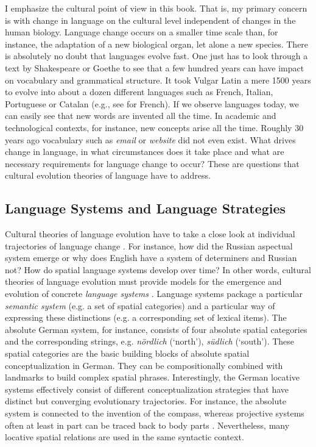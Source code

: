 I emphasize the cultural point of view in this book. That is, my primary concern is
with change in language on the cultural level independent of changes in the human 
biology. Language change occurs on a smaller time scale than, for instance, the 
adaptation of a new biological organ, let alone a new species. There is absolutely no 
doubt that languages evolve fast. One just has to look through a text by 
Shakespeare or Goethe to see that a few hundred years can have impact
on vocabulary and grammatical structure. It took Vulgar Latin a mere 1500 years to 
evolve into about a dozen different languages such as French, Italian, 
Portuguese or Catalan (e.g., see \citealp{pope1952latin} for French). 
If we observe languages today, we can easily see 
that new words are invented all the time.
In academic and technological contexts, for instance, new concepts arise all the time.
Roughly 30 years ago vocabulary such as \textit{email} or \textit{website} did not even exist.
What drives change in language, in what circumstances does it take place and 
what are necessary requirements for language change to occur? These are questions 
that cultural evolution theories of language have to address.

\subsection{Language Systems and Language Strategies}
Cultural theories of language evolution have to take a close look at individual 
trajectories of language change \citep{steels2011self-organization}. For instance, 
how did the Russian aspectual system emerge or why does English have a
system of determiners and Russian not? How do spatial language systems 
develop over time? In other words, cultural theories of language
evolution must provide models for the emergence and evolution of concrete
\emph{language systems} \citep{steels2011self-organization}. 
Language systems package a particular 
\emph{semantic system} (e.g. a set of spatial categories) and a 
particular way of expressing these distinctions (e.g. a corresponding set of 
lexical items). The absolute German system, for instance, consists of 
four absolute spatial categories and the corresponding strings, e.g. 
\textit{n\"ordlich} (`north'), \textit{s\"udlich} (`south'). These spatial
categories are the basic building blocks of absolute spatial conceptualization 
in German. They can be compositionally combined with landmarks to
build complex spatial phrases. Interestingly, the 
German locative systems effectively consist of different conceptualization
strategies that have distinct but converging evolutionary trajectories. For instance,
the absolute system is connected to the invention of the compass,
whereas projective systems often at least in part can be traced back to 
body parts \citep{traugott1991grammaticalization}.
Nevertheless, many locative spatial relations are used in the same syntactic 
context.

